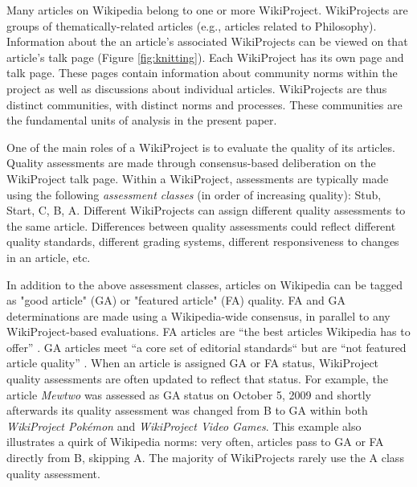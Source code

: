 Many articles on Wikipedia belong to one or more WikiProject.
WikiProjects are groups of thematically-related articles
(e.g., articles related to Philosophy).
Information about the an article's associated WikiProjects
can be viewed on that
article's talk page (Figure \ref{fig:knitting}).
Each WikiProject has its own page and talk page.
These pages contain information about community norms within the project
as well as discussions about individual articles.
WikiProjects are thus distinct communities, with distinct norms and processes.
These communities are the fundamental units of analysis in the present paper.

One of the main roles of a WikiProject is to evaluate the quality of its articles.
Quality assessments are made through consensus-based deliberation on the WikiProject
talk page.
Within a WikiProject,
assessments are typically made using the following {\em assessment classes}
(in order of increasing quality):
Stub, Start, C, B, A.
Different WikiProjects can assign different quality assessments to the same
article.
Differences between quality assessments could reflect different quality standards,
different grading systems, different responsiveness to changes in an article, etc.

In addition to the above assessment classes, articles on Wikipedia can be tagged as
"good article" (GA) or "featured article" (FA) quality.
FA and GA determinations are made using a Wikipedia-wide consensus,
in parallel to any WikiProject-based evaluations.
FA articles are ``the best articles Wikipedia has to offer''
\cite{}.
GA articles meet ``a core set of editorial standards`` but are ``not featured article quality''
\cite{}.
When an article is assigned GA or FA status,
WikiProject quality assessments are often updated to reflect that status.
For example, the article {\em Mewtwo} was assessed as GA status on October 5,
2009 and shortly afterwards
its quality assessment was changed from B to GA within both
{\em WikiProject Pok\'emon} and
{\em WikiProject Video Games}.
This example also illustrates a quirk of Wikipedia norms:
very often, articles pass to GA or FA directly from B, skipping A.
The majority of WikiProjects rarely use the A class quality assessment.

